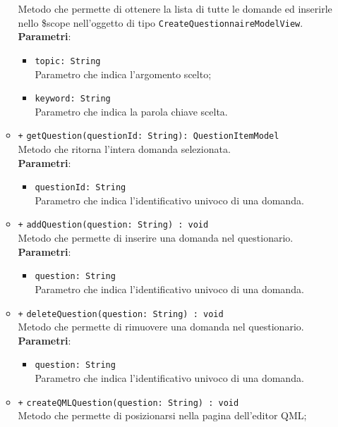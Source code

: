 \begin{itemize}
\begin{itemize}
		Metodo che permette di ottenere la lista di tutte le domande ed inserirle nello \$scope nell'oggetto di tipo \texttt{CreateQuestionnaireModelView}.\\
		\textbf{Parametri}:
		\begin{itemize}
			\item \texttt{topic: String}\\ Parametro che indica l'argomento scelto;
			\item \texttt{keyword: String}\\ Parametro che indica la parola chiave scelta.
		\end{itemize}
		\item \texttt{+} \texttt{getQuestion(questionId: String): QuestionItemModel} \\
		Metodo che ritorna l'intera domanda selezionata.\\
		\textbf{Parametri}:
		\begin{itemize}
			\item \texttt{questionId: String}\\ Parametro che indica l'identificativo univoco di una domanda.
		\end{itemize}
		\item \texttt{+} \texttt{addQuestion(question: String) : void} \\
		Metodo che permette di inserire una domanda nel questionario.\\
		\textbf{Parametri}:
		\begin{itemize}
			\item \texttt{question: String}\\ Parametro che indica l'identificativo univoco di una domanda.
		\end{itemize}
		\item \texttt{+} \texttt{deleteQuestion(question: String) : void} \\
		Metodo che permette di rimuovere una domanda nel questionario.\\
		\textbf{Parametri}:
		\begin{itemize}
			\item \texttt{question: String}\\ Parametro che indica l'identificativo univoco di una domanda.
		\end{itemize}
		\item \texttt{+} \texttt{createQMLQuestion(question: String) : void} \\
		Metodo che permette di posizionarsi nella pagina dell'editor QML;\\

\end{itemize}
\end{itemize}
